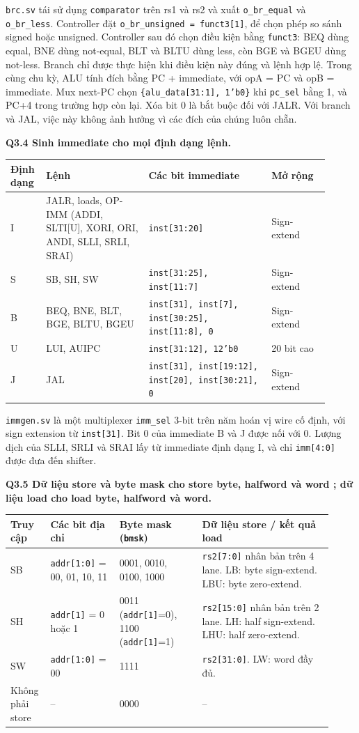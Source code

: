 \documentclass[10pt,a4paper]{article}
\newcommand{\code}[1]{\texttt{#1}}
\begin{document}
\code{brc.sv} tái sử dụng \code{comparator} trên rs1 và rs2 và xuất
\code{o\_br\_equal} và \code{o\_br\_less}. Controller đặt
\code{o\_br\_unsigned = funct3[1]}, để chọn phép so sánh signed hoặc unsigned.
Controller sau đó chọn điều kiện bằng \code{funct3}: BEQ dùng equal,
BNE dùng not-equal, BLT và BLTU dùng less, còn BGE và BGEU dùng not-less.
Branch chỉ được thực hiện khi điều kiện này đúng và lệnh hợp lệ. Trong cùng
chu kỳ, ALU tính đích bằng PC + immediate, với opA = PC và opB = immediate.
Mux next-PC chọn \code{\{alu\_data[31:1], 1'b0\}} khi \code{pc\_sel} bằng 1,
và PC+4 trong trường hợp còn lại. Xóa bit 0 là bắt buộc đối với JALR. Với
branch và JAL, việc này không ảnh hưởng vì các đích của chúng luôn chẵn.

\textbf{Q3.4 Sinh immediate cho mọi định dạng lệnh.}

\begin{tabular}{@{}p{0.08\linewidth}p{0.30\linewidth}p{0.36\linewidth}p{0.17\linewidth}@{}}
\toprule
\textbf{Định dạng} & \textbf{Lệnh} & \textbf{Các bit immediate} & \textbf{Mở rộng} \\
\midrule
I & JALR, loads, OP-IMM (ADDI, SLTI[U], XORI, ORI, ANDI, SLLI, SRLI, SRAI) & \code{inst[31:20]} & Sign-extend \\
S & SB, SH, SW & \code{inst[31:25], inst[11:7]} & Sign-extend \\
B & BEQ, BNE, BLT, BGE, BLTU, BGEU & \code{inst[31], inst[7], inst[30:25], inst[11:8], 0} & Sign-extend \\
U & LUI, AUIPC & \code{inst[31:12], 12'b0} & 20 bit cao \\
J & JAL & \code{inst[31], inst[19:12], inst[20], inst[30:21], 0} & Sign-extend \\
\bottomrule
\end{tabular}

\code{immgen.sv} là một multiplexer \code{imm\_sel} 3-bit trên năm hoán vị
wire cố định, với sign extension từ \code{inst[31]}. Bit 0 của immediate B và
J được nối với 0. Lượng dịch của SLLI, SRLI và SRAI lấy từ immediate định
dạng I, và chỉ \code{imm[4:0]} được đưa đến shifter.

\textbf{Q3.5 Dữ liệu store và byte mask cho store byte, halfword và word
; dữ liệu load cho load byte, halfword và word.}

\begin{tabular}{@{}p{0.10\linewidth}p{0.20\linewidth}p{0.24\linewidth}p{0.38\linewidth}@{}}
\toprule
\textbf{Truy cập} & \textbf{Các bit địa chỉ} & \textbf{Byte mask (\code{bmsk})} & \textbf{Dữ liệu store / kết quả load} \\
\midrule
SB & \code{addr[1:0]} = 00, 01, 10, 11 & 0001, 0010, 0100, 1000 & \code{rs2[7:0]} nhân bản trên 4 lane. LB: byte sign-extend. LBU: byte zero-extend. \\
SH & \code{addr[1]} = 0 hoặc 1 & 0011 (\code{addr[1]}=0), 1100 (\code{addr[1]}=1) & \code{rs2[15:0]} nhân bản trên 2 lane. LH: half sign-extend. LHU: half zero-extend. \\
SW & \code{addr[1:0]} = 00 & 1111 & \code{rs2[31:0]}. LW: word đầy đủ. \\
Không phải store & -- & 0000 & -- \\
\bottomrule
\end{tabular}
\end{document}
